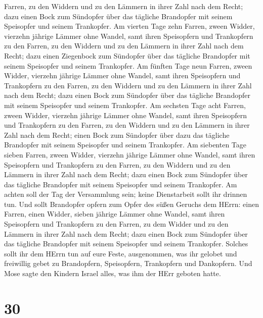 Farren, zu den Widdern und zu den Lämmern in ihrer Zahl nach dem Recht;
 dazu einen Bock zum Sündopfer über das tägliche Brandopfer
mit seinem Speisopfer und seinem Trankopfer.  Am vierten
Tage zehn Farren, zween Widder, vierzehn jährige Lämmer ohne Wandel,
 samt ihren Speisopfern und Trankopfern zu den Farren, zu
den Widdern und zu den Lämmern in ihrer Zahl nach dem Recht;
 dazu einen Ziegenbock zum Sündopfer über das tägliche
Brandopfer mit seinem Speisopfer und seinem Trankopfer.  Am
fünften Tage neun Farren, zween Widder, vierzehn jährige Lämmer ohne
Wandel,  samt ihren Speisopfern und Trankopfern zu den
Farren, zu den Widdern und zu den Lämmern in ihrer Zahl nach dem Recht;
 dazu einen Bock zum Sündopfer über das tägliche Brandopfer
mit seinem Speisopfer und seinem Trankopfer.  Am sechsten
Tage acht Farren, zween Widder, vierzehn jährige Lämmer ohne Wandel,
 samt ihren Speisopfern und Trankopfern zu den Farren, zu
den Widdern und zu den Lämmern in ihrer Zahl nach dem Recht; einen Bock
zum Sündopfer über  dazu das tägliche Brandopfer mit seinem
Speisopfer und seinem Trankopfer.  Am siebenten Tage sieben
Farren, zween Widder, vierzehn jährige Lämmer ohne Wandel, 
samt ihren Speisopfern und Trankopfern zu den Farren, zu den Widdern und
zu den Lämmern in ihrer Zahl nach dem Recht;  dazu einen
Bock zum Sündopfer über das tägliche Brandopfer mit seinem Speisopfer
und seinem Trankopfer.  Am achten soll der Tag der
Versammlung sein; keine Dienstarbeit sollt ihr drinnen tun.
 Und sollt Brandopfer opfern zum Opfer des süßen Geruchs
dem HErrn: einen Farren, einen Widder, sieben jährige Lämmer ohne
Wandel,  samt ihren Speisopfern und Trankopfern zu den
Farren, zu dem Widder und zu den Lämmern in ihrer Zahl nach dem Recht;
 dazu einen Bock zum Sündopfer über das tägliche Brandopfer
mit seinem Speisopfer und seinem Trankopfer.  Solches sollt
ihr dem HErrn tun auf eure Feste, ausgenommen, was ihr gelobet und
freiwillig gebet zu Brandopfern, Speisopfern, Trankopfern und
Dankopfern.  Und Mose sagte den Kindern Israel alles, was
ihm der HErr geboten hatte.

\hypertarget{section-29}{%
\section{30}\label{section-29}}

